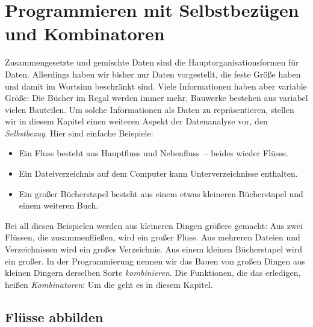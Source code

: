 
\chapter{Programmieren mit Selbstbezügen und Kombinatoren}
\label{cha:selbstbezug}

Zusammengesetzte und gemischte Daten sind die Hauptorganisationsformen
für Daten.  Allerdings haben wir bisher nur Daten vorgestellt, die
feste Größe haben und damit im Wortsinn beschränkt sind.  Viele
Informationen haben aber variable Größe: Die Bücher im Regal werden
immer mehr, Bauwerke bestehen aus variabel vielen Bauteilen.  Um
solche Informationen als Daten zu repräsentieren, stellen wir in
diesem Kapitel einen weiteren Aspekt der Datenanalyse vor, den
\textit{Selbstbezug}.  Hier sind einfache
Beispiele:
%
\begin{itemize}
\item Ein Fluss besteht aus Hauptfluss und Nebenfluss~-- beides wieder
  Flüsse.
\item Ein Dateiverzeichnis auf dem Computer kann 
  Unterverzeichnisse enthalten.
\item Ein großer Bücherstapel besteht aus einem etwas kleineren
  Bücherstapel und einem weiteren Buch.
\end{itemize}
%
Bei all diesen Beispielen werden aus kleineren Dingen größere gemacht:
Aus zwei Flüssen, die zusammenfließen, wird ein großer Fluss.  Aus
mehreren Dateien und Verzeichnissen wird ein großes Verzeichnis.  Aus
einem kleinen Bücherstapel wird ein großer.  In der Programmierung
nennen wir das Bauen von großen Dingen aus kleinen Dingern derselben
Sorte \textit{kombinieren}. Die Funktionen, die das erledigen, heißen
\textit{Kombinatoren}: Um die geht es in diesem Kapitel.

\section{Flüsse abbilden}


